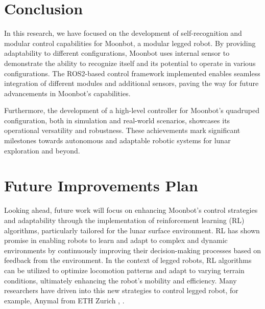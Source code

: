 \section{Conclusion}

In this research, we have focused on the development of self-recognition and modular control capabilities for Moonbot, a modular legged robot. By providing adaptability to different configurations, Moonbot uses internal sensor to demonstrate the ability to recognize itself and its potential to operate in various configurations. The ROS2-based control framework implemented enables seamless integration of different modules and additional sensors, paving the way for future advancements in Moonbot's capabilities.

Furthermore, the development of a high-level controller for Moonbot's quadruped configuration, both in simulation and real-world scenarios, showcases its operational versatility and robustness. These achievements mark significant milestones towards autonomous and adaptable robotic systems for lunar exploration and beyond.

\section{Future Improvements Plan}

Looking ahead, future work will focus on enhancing Moonbot's control strategies and adaptability through the implementation of reinforcement learning (RL) algorithms, particularly tailored for the lunar surface environment. RL has shown promise in enabling robots to learn and adapt to complex and dynamic environments by continuously improving their decision-making processes based on feedback from the environment. In the context of legged robots, RL algorithms can be utilized to optimize locomotion patterns and adapt to varying terrain conditions, ultimately enhancing the robot's mobility and efficiency. Many researchers have driven into this new strategies to control legged robot, for example, Anymal from ETH Zurich \cite{anymalRL}, \cite{anymalDRL}.

